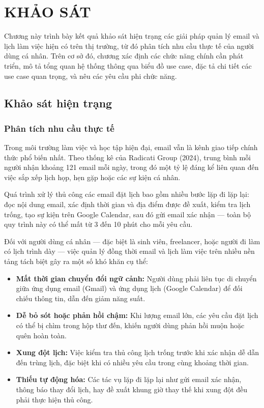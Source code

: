 \documentclass[../DoAn.tex]{subfiles}
\begin{document}
\chapter{KHẢO SÁT}

Chương này trình bày kết quả khảo sát hiện trạng các giải pháp quản lý email và lịch làm việc hiện có trên thị trường, từ đó phân tích nhu cầu thực tế của người dùng cá nhân. Trên cơ sở đó, chương xác định các chức năng chính cần phát triển, mô tả tổng quan hệ thống thông qua biểu đồ use case, đặc tả chi tiết các use case quan trọng, và nêu các yêu cầu phi chức năng.

\section{Khảo sát hiện trạng}
\label{section:2.1}

\subsection{Phân tích nhu cầu thực tế}

Trong môi trường làm việc và học tập hiện đại, email vẫn là kênh giao tiếp chính thức phổ biến nhất. Theo thống kê của Radicati Group (2024), trung bình mỗi người nhận khoảng 121 email mỗi ngày, trong đó một tỷ lệ đáng kể liên quan đến việc sắp xếp lịch họp, hẹn gặp hoặc các sự kiện cá nhân.

Quá trình xử lý thủ công các email đặt lịch bao gồm nhiều bước lặp đi lặp lại: đọc nội dung email, xác định thời gian và địa điểm được đề xuất, kiểm tra lịch trống, tạo sự kiện trên Google Calendar, sau đó gửi email xác nhận — toàn bộ quy trình này có thể mất từ 3 đến 10 phút cho mỗi yêu cầu.

Đối với người dùng cá nhân — đặc biệt là sinh viên, freelancer, hoặc người đi làm có lịch trình dày — việc quản lý đồng thời email và lịch làm việc trên nhiều nền tảng tách biệt gây ra một số khó khăn cụ thể:

\begin{itemize}
    \item \textbf{Mất thời gian chuyển đổi ngữ cảnh:} Người dùng phải liên tục di chuyển giữa ứng dụng email (Gmail) và ứng dụng lịch (Google Calendar) để đối chiếu thông tin, dẫn đến giảm năng suất.
    \item \textbf{Dễ bỏ sót hoặc phản hồi chậm:} Khi lượng email lớn, các yêu cầu đặt lịch có thể bị chìm trong hộp thư đến, khiến người dùng phản hồi muộn hoặc quên hoàn toàn.
    \item \textbf{Xung đột lịch:} Việc kiểm tra thủ công lịch trống trước khi xác nhận dễ dẫn đến trùng lịch, đặc biệt khi có nhiều yêu cầu trong cùng khoảng thời gian.
    \item \textbf{Thiếu tự động hóa:} Các tác vụ lặp đi lặp lại như gửi email xác nhận, thông báo thay đổi lịch, hay đề xuất khung giờ thay thế khi xung đột đều phải thực hiện thủ công.
\end{itemize}
\end{document}
